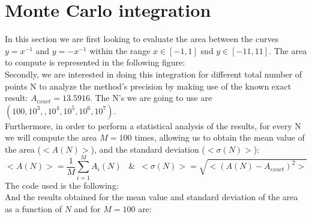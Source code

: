 \documentclass{article}
\begin{document}
\section{Monte Carlo integration}
In this section we are first looking to evaluate the area between the curves $y=x^{-1}$ and $y=-x^{-1}$ within the range $x \in [-1,1]$ snd $y \in [-11,11]$. The area to compute is represented in the following figure:\\
Secondly, we are interested in doing this integration for different total number of points N to analyze the method's precision by making use of the known exact result: $A_{exact}=13.5916$. The N's we are going to use are $(100,10^3,,10^4,10^5,10^6,10^7)$.\\
Furthermore, in order to perform a statistical analysis of the results, for every N we will compute the area $M=100$ times, allowing us to obtain the mean value of the area ($ <A(N)>$), and the standard deviation ($ <\sigma(N)>$):
 \begin{equation}
   <A(N)>=\frac{1}{M}\sum_{i=1}^{M}A_{i}(N) \,\,\,\,\, \& \,\,\, <\sigma(N)>=\sqrt{<(A(N)-A_{exact})^{2}>}
 \end{equation}
The code used is the following:\\
And the results obtained for the mean value and standard deviation of the area as a function of $N$ and for $M=100$ are:\\
\end{document}
